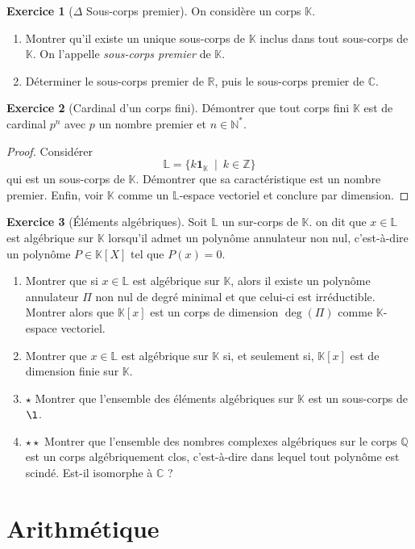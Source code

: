 \documentclass[french]{book}
\newcommand{\N}{\mathbb{N}}
\newcommand{\Z}{\mathbb{Z}}
\newcommand{\Q}{\mathbb{Q}}
\newcommand{\R}{\mathbb{R}}
\newcommand{\C}{\mathbb{C}}
\newcommand{\K}{\mathbb{K}}
\renewcommand{\L}{\mathbb{L}}
\newcommand{\st}{^*}
\theoremstyle{definition}
\newtheorem{ex}{Exercice}[chapter]
\theoremstyle{theorem}
\theoremstyle{remark}
\begin{document}
\begin{ex}[$\Delta$ Sous-corps premier]
	On considère un corps $\K$.
	\begin{enumerate}
		\item Montrer qu'il existe un unique sous-corps de $\K$ inclus dans tout sous-corps de $\K$. On l'appelle \textit{sous-corps premier} de $\K$.
		\item Déterminer le sous-corps premier de $\R$, puis le sous-corps premier de $\C$.
	\end{enumerate}
\end{ex}

\begin{ex}[Cardinal d'un corps fini]
	Démontrer que tout corps fini $\K$ est de cardinal $p^n$ avec $p$ un nombre premier et $n\in\N\st$.
\end{ex}

\begin{proof}
	Considérer $$\L=\{k\mathbf{1}_\K \ \mid \ k\in\Z\}$$ qui est un sous-corps de $\K$. Démontrer que sa caractéristique est un nombre premier. Enfin, voir $\K$ comme un $\L$-espace vectoriel et conclure par dimension.
\end{proof}

\begin{ex}[Éléments algébriques]
	Soit $\L$ un sur-corps de $\K$. on dit que $x\in\L$ est algébrique sur $\K$ lorsqu'il admet un polynôme annulateur non nul, c'est-à-dire un polynôme $P\in\K[X]$ tel que $P(x)=0$.
	\begin{enumerate}
		\item Montrer que si $x\in\L$ est algébrique sur $\K$, alors il existe un polynôme annulateur $\Pi$ non nul de degré minimal et que celui-ci est irréductible. Montrer alors que $\K[x]$ est un corps de dimension $\deg(\Pi)$ comme $\K$-espace vectoriel.
		\item Montrer que $x\in\L$ est algébrique sur $\K$ si, et seulement si, $\K[x]$ est de dimension finie sur $\K$.
		\item $\star$ Montrer que l'ensemble des éléments algébriques sur $\K$ est un sous-corps de $\l$.
		\item $\star\star$ Montrer que l'ensemble des nombres complexes algébriques sur le corps $\Q$ est un corps algébriquement clos, c'est-à-dire dans lequel tout polynôme est scindé. Est-il isomorphe à $\C$ ?
	\end{enumerate}
\end{ex}


\chapter{Arithmétique}
\end{document}
